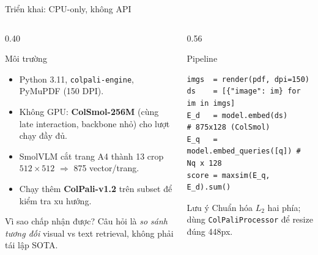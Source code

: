 \documentclass[aspectratio=169,10pt]{beamer}
\newcommand{\code}[1]{\texttt{\footnotesize #1}}
\begin{document}
\begin{frame}[fragile]{Triển khai: CPU-only, không API}
  \begin{columns}[T]
    \begin{column}{0.40\textwidth}
      \begin{block}{\small Môi trường}
        \footnotesize
        \begin{itemize}
          \item Python 3.11, \code{colpali-engine}, PyMuPDF (150 DPI).
          \item Không GPU: \textbf{ColSmol-256M} (cùng late interaction, backbone nhỏ) cho lượt chạy đầy đủ.
          \item SmolVLM cắt trang A4 thành 13 crop $512\times512$ $\Rightarrow$ 875 vector/trang.
          \item Chạy thêm \textbf{ColPali-v1.2} trên subset để kiểm tra xu hướng.
        \end{itemize}
      \end{block}
      \begin{block}{\small Vì sao chấp nhận được?}
        \footnotesize
        Câu hỏi là \emph{so sánh tương đối} visual vs text retrieval, không phải tái lập SOTA.
      \end{block}
    \end{column}
    \begin{column}{0.56\textwidth}
      \begin{block}{\small Pipeline}
        \scriptsize
\begin{verbatim}
imgs  = render(pdf, dpi=150)
ds    = [{"image": im} for im in imgs]
E_d   = model.embed(ds)         # 875x128 (ColSmol)
E_q   = model.embed_queries([q]) # Nq x 128
score = maxsim(E_q, E_d).sum()
\end{verbatim}
      \end{block}
      \begin{block}{\small Lưu ý}
        \footnotesize
        Chuẩn hóa $L_2$ hai phía; dùng \code{ColPaliProcessor} để resize đúng 448px.
      \end{block}
    \end{column}
  \end{columns}
\end{frame}
\end{document}
